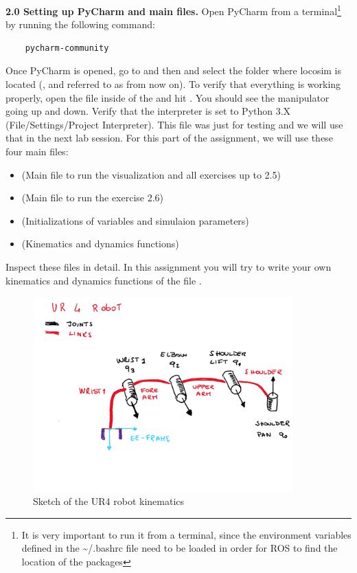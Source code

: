 \documentclass[11pt]{article}
\begin{document}
\textbf{2.0 Setting up PyCharm and main files.} Open PyCharm from a terminal\footnote{It is very important to run it from a terminal, since the environment variables defined in the \textasciitilde/.bashrc file need to be loaded in order for ROS to find the location of the packages} by running the following command:
%
\begin{verbatim}
	pycharm-community
\end{verbatim}
%
Once PyCharm is opened, go to  and then  and select the folder where locosim is located (, and referred to as  from now on). To verify that everything is working properly, open the file   inside of the  and hit . You should see the manipulator going up and down. 
Verify that the interpreter is set to Python 3.X (File/Settings/Project Interpreter).
This file was just for testing and we will use that in  the next lab session.
%
%
For this part of the assignment, we will use these four main files: 
\begin{itemize}
	\item {} (Main file to run the visualization and all exercises up to 2.5)
	\item {} (Main file to run the exercise 2.6)
	\item {} (Initializations of variables and simulaion parameters)
	\item {} (Kinematics and dynamics functions)
\end{itemize}
Inspect these files in detail. In this assignment you will try to write your own kinematics and dynamics functions of the file .\\


\begin{figure}[bht]
	\centering
	\includegraphics[width=10cm]{pics/ur4_Robot.pdf}
	\caption{Sketch of the UR4 robot kinematics}
	\label{fig:ur4_robot_kinematics}
\end{figure} 
\end{document}
